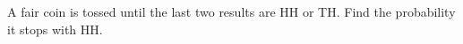 A fair coin is tossed until the last two results are HH or TH. Find the probability it stops with HH.
